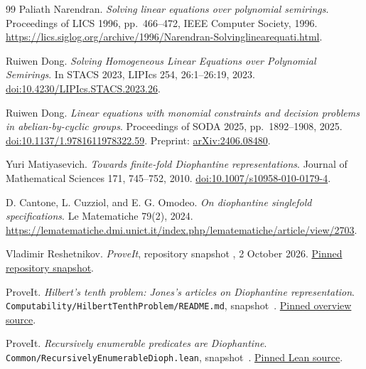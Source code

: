 \documentclass[11pt,letterpaper]{article}
\numberwithin{equation}{section}
\theoremstyle{definition}
\begin{document}
\begin{thebibliography}{99}
Paliath Narendran.
\emph{Solving linear equations over polynomial semirings}.
Proceedings of LICS 1996, pp.\ 466--472, IEEE Computer Society, 1996.
\url{https://lics.siglog.org/archive/1996/Narendran-Solvinglinearequati.html}.

Ruiwen Dong.
\emph{Solving Homogeneous Linear Equations over Polynomial Semirings}.
In STACS 2023, LIPIcs 254, 26:1--26:19, 2023.
\href{https://doi.org/10.4230/LIPIcs.STACS.2023.26}{doi:10.4230/LIPIcs.STACS.2023.26}.

Ruiwen Dong.
\emph{Linear equations with monomial constraints and decision problems
in abelian-by-cyclic groups}.
Proceedings of SODA 2025, pp.\ 1892--1908, 2025.
\href{https://doi.org/10.1137/1.9781611978322.59}{doi:10.1137/1.9781611978322.59}.
Preprint: \href{https://arxiv.org/abs/2406.08480}{arXiv:2406.08480}.

Yuri Matiyasevich.
\emph{Towards finite-fold Diophantine representations}.
Journal of Mathematical Sciences 171, 745--752, 2010.
\href{https://doi.org/10.1007/s10958-010-0179-4}{doi:10.1007/s10958-010-0179-4}.

D. Cantone, L. Cuzziol, and E. G. Omodeo.
\emph{On diophantine singlefold specifications}.
Le Matematiche 79(2), 2024.
\url{https://lematematiche.dmi.unict.it/index.php/lematematiche/article/view/2703}.

Vladimir Reshetnikov.
\emph{ProveIt}, repository snapshot
, 2 October 2026.
\href{https://github.com/VladimirReshetnikov/ProveIt/tree/48ee077c7ab647d7121370e95a353169c89c79db}{Pinned repository snapshot}.

ProveIt.
\emph{Hilbert's tenth problem: Jones's articles on Diophantine representation}.
\texttt{Computability/HilbertTenthProblem/README.md}, snapshot~\cite{bt:repo}.
\href{https://github.com/VladimirReshetnikov/ProveIt/blob/48ee077c7ab647d7121370e95a353169c89c79db/Computability/HilbertTenthProblem/README.md}{Pinned overview source}.

ProveIt.
\emph{Recursively enumerable predicates are Diophantine}.
\texttt{Common/RecursivelyEnumerableDioph.lean}, snapshot~\cite{bt:repo}.
\href{https://github.com/VladimirReshetnikov/ProveIt/blob/48ee077c7ab647d7121370e95a353169c89c79db/Computability/HilbertTenthProblem/Lean/Diophantine/Common/RecursivelyEnumerableDioph.lean}{Pinned Lean source}.

\end{thebibliography}
\endgroup
\end{document}
